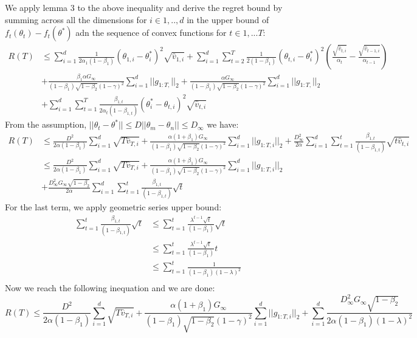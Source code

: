 \documentclass[10pt]{article}
\begin{document}
We apply lemma 3 to the above inequality and derive the regret bound by summing across all the dimensions for $ i \in 1,..,d$ in the upper bound of $f_t(\theta_t) - f_t(\theta^*)$ adn the sequence of convex functions for $ t \in 1,...T$:
\begin{align*}
R(T) &\leq \sum^d_{i=1} \frac{1}{2\alpha_1(1-\beta_1)}(\theta_{1,i} - \theta^*_i)^2 \sqrt{\hat{v}_{1,i}} + \sum_{i=1}^d \sum_{t=2}^T \frac{1}{2(1-\beta_1)}(\theta_{t,i} - \theta^*_i)^2 (\frac{\sqrt{\hat{v}_{t,i}}}{\alpha_t} - \frac{\sqrt{\hat{v}_{t-1,i}}}{\alpha_{t-1}})\\ 
&+ \frac{\beta_1 \alpha G_\infty}{(1-\beta_1) \sqrt{1-\beta_2} (1-\gamma)^2} \sum_{i=1}^d || g_{1:T,}||_2 + \frac{\alpha G_\infty}{(1-\beta_1) \sqrt{1-\beta_2} (1-\gamma)^2} \sum_{i=1}^d || g_{1:T,}||_2 \\
&+ \sum^d_{i=1} \sum^T_{t=1} \frac{\beta_{1,t}}{2 \alpha_t(1-\beta_{1,t})}(\theta^*_i - \theta_{t,i})^2 \sqrt{\hat{v}_{t,i}}
\end{align*}
From the assumption, $||\theta_t  - \theta^*|| \leq D ||\theta_m  - \theta_n|| \leq D_\infty  $ we have:
\begin{align*}
R(T) &\leq \frac{D^2}{2\alpha(1-\beta_1)} \sum_{i=1}^d \sqrt{T\hat{v}_{T,i}} + \frac{\alpha(1+\beta_1) G_\infty}{(1-\beta_1)\sqrt{1 - \beta_2}(1-\gamma)^2} \sum_{i=1}^d ||g_{1:T,i} ||_2 + \frac{D^2_{\infty}}{2\alpha} \sum_{i=1}^d \sum_{t=1}^t \frac{\beta_{1,t}}{(1-\beta_{1,t})} \sqrt{t \hat{v}_{t,i}} \\
&\leq \frac{D^2}{2\alpha(1-\beta_1)} \sum_{i=1}^d \sqrt{T\hat{v}_{T,i}} + \frac{\alpha(1+\beta_1) G_\infty}{(1-\beta_1)\sqrt{1 - \beta_2}(1-\gamma)^2} \sum_{i=1}^d ||g_{1:T,i} ||_2 \\
&+\frac{D^2_{\infty} G_\infty \sqrt{1-\beta_2}}{2\alpha} \sum_{i=1}^d \sum_{t=1}^t \frac{\beta_{1,t}}{(1-\beta_{1,t})} \sqrt{t}
\end{align*}
For the last term, we apply geometric series upper bound:
\begin{align*}
\sum_{t=1}^t \frac{\beta_{1,t}}{(1-\beta_{1,t})} \sqrt{t} &\leq \sum_{t=1}^t \frac{\lambda^{t-1} \sqrt{t}}{(1-\beta_{1})} \sqrt{t} \\
&\leq \sum_{t=1}^t \frac{\lambda^{t-1} \sqrt{t}}{(1-\beta_{1})} t \\
&\leq \sum_{t=1}^t \frac{1}{(1-\beta_{1}) (1-\lambda)^2}  \\
\end{align*}
Now we reach the following inequation and we are done:
$$
R(T) \leq \frac{D^2}{2 \alpha (1-\beta_1)} \sum_{i=1}^d \sqrt{T \hat{v}_{T,i}} + \frac{\alpha(1 + \beta_1) G_\infty}{(1-\beta_1) \sqrt{1-\beta_2}(1-\gamma)^2} \sum_{i=1}^d ||g_{1:T,i} ||_2 + \sum_{i=1}^d \frac{D^2_\infty G_\infty \sqrt{1-\beta_2}}{2\alpha(1-\beta_1)(1-\lambda)^2}$$
\end{document}
